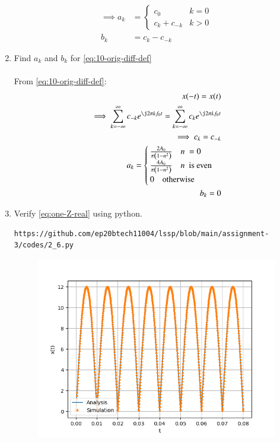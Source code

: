 \documentclass[journal,12pt,twocolumn]{IEEEtran}
\renewcommand\thesection{\arabic{section}}
\begin{document}
\begin{enumerate}[label=\thesection.\arabic*,ref=\thesection.\theenumi]
		\begin{align}
			\implies
			a_k &= 
			\begin{cases}
				c_0 & k = 0 \\
				c_k + c_{-k} & k > 0
			\end{cases} \label{eq:ak} \\
			b_k &= c_k - c_{-k}
			\label{eq:bk}
		\end{align}
		\item Find $a_k$ and $b_k$ for 
		\eqref{eq:10-orig-diff-def}\\
		\solution\\
		From \eqref{eq:10-orig-diff-def}:
		\begin{align}
			x(-t) = x(t)\\
			\implies \sum_{k = -\infty}^{\infty}c_{-k}e^{\j2\pi kf_0t}
			= \sum_{k = -\infty}^{\infty}c_ke^{\j2\pi kf_0 t}\\
			\implies c_k = c_{-k}\\
			a_k = \begin{cases}
				\frac{2A_0}{\pi\brak{1-n^2}} \quad n\ = 0\\
				\frac{4A_0}{\pi\brak{1-n^2}} \quad n\ \text{ is even}\\
				0 \quad \text{otherwise}
			\end{cases}\\
			b_k = 0
		\end{align}
		\item Verify 
		\eqref{eq:one-Z-real}
		using python.
		\begin{lstlisting}
https://github.com/ep20btech11004/lssp/blob/main/assignment-3/codes/2_6.py
		\end{lstlisting}
		\begin{figure}[!ht]
			\begin{center}
				\includegraphics[width=\columnwidth]{./figs/2_6.png}
			\end{center}
			\label{fig:ft}	
		\end{figure}
	\end{enumerate}
\end{document}
